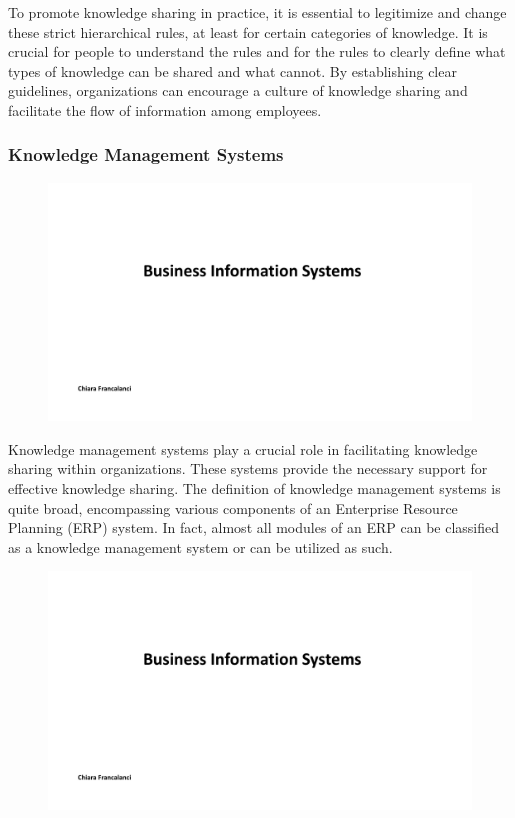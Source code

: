 To promote knowledge sharing in practice, it is essential to legitimize
and change these strict hierarchical rules, at least for certain
categories of knowledge. It is crucial for people to understand the
rules and for the rules to clearly define what types of knowledge can be
shared and what cannot. By establishing clear guidelines, organizations
can encourage a culture of knowledge sharing and facilitate the flow of
information among employees.

\subsubsection{Knowledge Management
    Systems}\label{knowledge-management-systems}

\begin{figure}[!h]
    \centering
    \includegraphics[page=15, trim = 1.5cm 7cm 1.5cm 4cm, clip, width=\textwidth]{images/05 - KM.pdf}
\end{figure}

Knowledge management systems play a crucial role in facilitating
knowledge sharing within organizations. These systems provide the
necessary support for effective knowledge sharing. The definition of
knowledge management systems is quite broad, encompassing various
components of an Enterprise Resource Planning (ERP) system. In fact,
almost all modules of an ERP can be classified as a knowledge management
system or can be utilized as such.

\begin{figure}[!h]
    \centering
    \includegraphics[page=16, trim = 3cm 3.8cm 4cm 5.3cm, clip, width=\textwidth]{images/05 - KM.pdf}
\end{figure}

